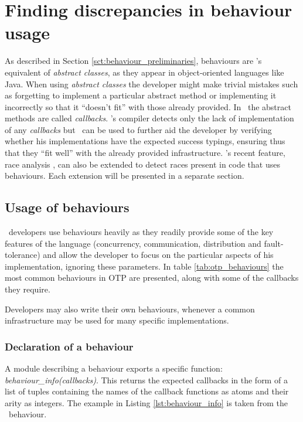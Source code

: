 \chapter{Finding discrepancies in behaviour usage}
\label{chp:behaviours}

As described in Section \ref{sct:behaviour_preliminaries}, behaviours
are \er's equivalent of \emph{abstract classes}, as they appear in
object-oriented languages like Java. When using \emph{abstract
  classes} the developer might make trivial mistakes such as
forgetting to implement a particular abstract method or implementing
it incorrectly so that it ``doesn't fit'' with those already
provided. In \er\ the abstract methods are called
\emph{callbacks}. \er's compiler detects only the lack of
implementation of any \emph{callbacks} but \dr\ can be used to further
aid the developer by verifying whether his implementations have the
expected success typings, ensuring thus that they ``fit well'' with
the already provided infrastructure. \dr's recent feature, race
analysis \cite{Races@PADL-10}, can also be extended to detect races
present in code that uses behaviours. Each extension will be presented
in a separate section.

\section{Usage of behaviours}

\er\ developers use behaviours heavily as they readily provide some of
the key features of the language (concurrency, communication,
distribution and fault-tolerance) and allow the developer to focus on
the particular aspects of his implementation, ignoring these
parameters. In table \ref{tab:otp_behaviours} the most common
behaviours in OTP are presented, along with some of the callbacks they
require.



Developers may also write their own behaviours, whenever a common
infrastructure may be used for many specific implementations.

\subsection{Declaration of a behaviour}

A module describing a behaviour exports a specific function:
\emph{behaviour\_info(callbacks)}. This returns the expected callbacks
in the form of a list of tuples containing the names of the callback
functions as atoms and their arity as integers. The example in Listing
\ref{lst:behaviour_info} is taken from the \genserv\ behaviour.

